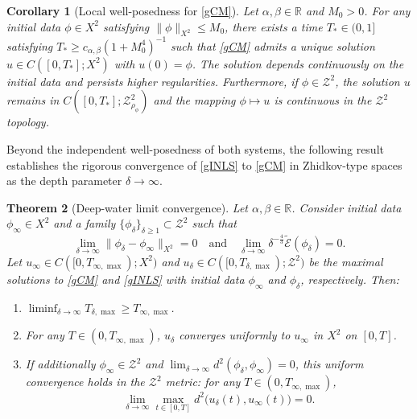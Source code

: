 \documentclass{amsart}
\newtheorem{theorem}{Theorem}[section]
\newtheorem{corollary}[theorem]{Corollary}
\numberwithin{equation}{section}
\begin{document}
\begin{corollary}[Local well-posedness for \eqref{gCM}]\label{cor:LWP-CM}
Let $\alpha, \beta \in \mathbb{R}$ and $M_0>0$. 
For any initial data $\phi\in X^2$ satisfying $\| \phi\|_{X^2}\leq M_0$, there exists a time $T_*\in (0,1]$ satisfying $T_*\geq c_{\alpha,\beta}(1+M_0^4)^{-1}$ such that \eqref{gCM} admits a unique solution $u\in C([0,T_*];X^2)$ with $u(0)=\phi$.
The solution depends continuously on the initial data and persists higher regularities.
Furthermore, if $\phi\in \mathcal{Z}^2$, the solution $u$ remains in $C([0,T_*];\mathcal{Z}^2_{\rho_\phi})$ and the mapping $\phi\mapsto u$ is continuous in the $\mathcal{Z}^2$ topology.
\end{corollary}

Beyond the independent well-posedness of both systems, the following result establishes the rigorous convergence of \eqref{gINLS} to \eqref{gCM} in Zhidkov-type spaces as the depth parameter  $\delta\to \infty$. 

\begin{theorem}[Deep-water limit convergence]\label{thm:conv}
Let $\alpha, \beta \in \mathbb{R}$. 
Consider initial data $\phi_\infty\in X^2$ and a family $\{ \phi _\delta\}_{\delta \geq 1} \subset \mathcal{Z}^2$ such that 
\[ \lim_{\delta\to \infty} \| \phi_\delta -\phi_\infty\|_{X^2}=0 \quad \text{and} \quad \lim_{\delta\to \infty}\delta^{-\frac{4}{3}}\widetilde{\mathcal{E}}(\phi_\delta)=0. \]
Let $u_{\infty} \in C([0,T_{\infty,\max});X^2)$ and $u_\delta \in C([0,T_{\delta,\max});\mathcal{Z}^2)$ be the maximal solutions to \eqref{gCM} and \eqref{gINLS} with initial data $\phi_\infty$ and $\phi_\delta$, respectively. 
Then:
\begin{enumerate}
\item[{\upshape (i)}] $\liminf_{\delta\to\infty}T_{\delta,\max}\geq T_{\infty,\max}$.
\item[{\upshape (ii)}] For any $T \in (0, T_{\infty,\max})$, $u_\delta$ converges uniformly to $u_\infty$ in $X^2$ on $[0,T]$.
\item[{\upshape (iii)}]  If additionally $\phi_\infty\in \mathcal{Z}^2$ and $\lim_{\delta\to \infty}d^2(\phi_\delta,\phi_\infty)=0$, this uniform convergence holds in the $\mathcal{Z}^2$ metric: for any $T \in (0, T_{\infty,\max})$,
\[ \lim_{\delta\to \infty}\max_{t\in [0,T]}d^2\big( u_\delta(t),u_\infty(t)\big)=0. \]
\end{enumerate}
\end{theorem}
\end{document}
